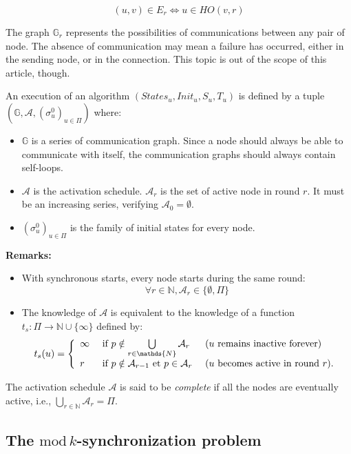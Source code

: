 \documentclass{article}
\newcommand{\ts}{t_{s}}
\begin{document}
$$(u, v) \in E_r \Leftrightarrow u \in HO(v, r)$$

The graph $\mathds{G}_r$ represents the possibilities of communications between any pair of node.
The absence of communication may mean a failure has occurred, either in the sending node, or in the connection.
This topic is out of the scope of this article, though.

An execution of an algorithm $(States_u, Init_u, S_u, T_u)$ is defined by a tuple
$(\mathds{G}, \mathcal{A}, (\sigma^0_u)_{u \in \Pi})$ where:

\begin{itemize}
	\item $\mathds{G}$ is a series of communication graph. Since a node should always be able to communicate 
		with itself, the communication graphs should always contain self-loops.
	\item $\mathcal{A}$ is the activation schedule. $\mathcal{A}_r$ is the set of active node in round $r$.
		It must be an increasing series, verifying $\mathcal{A}_0 = \emptyset$.
	\item $(\sigma^0_u)_{u \in \Pi}$ is the family of initial states for every node.
\end{itemize}

\textbf{Remarks:}

\begin{itemize}
	\item With synchronous starts, every node starts during the same round: 
		$$\forall r \in \mathds{N}, \mathcal{A}_r \in \{\emptyset, \Pi\}$$

	\item The knowledge of $\mathcal{A}$ is equivalent to the knowledge of a function
		$\ts: \Pi \rightarrow \mathds{N} \cup \{\infty\}$ defined by:
		$$\ts(u) = \left \{ \begin{array}{l ll}
		  \infty & \mbox{ if  } p \notin \bigcup\limits_{r \in \mathds{N}}  \mathcal{A}_r & 
			  \mbox { ($u$ remains inactive forever) } \\
		  r  & \mbox{ if  } p \notin \mathcal{A}_{r-1} \mbox{ et } p \in \mathcal{A}_{r}  &
			  \mbox{ ($u$ becomes active in round $r$)}.
		  \end{array} \right.$$

\end{itemize}
The activation schedule $\mathcal{A} $ is said to be \emph{complete} if all the nodes are eventually active,
	i.e., $ \bigcup\limits_{r \in \mathds{N}}  \mathcal{A}_r  = \Pi$.

\subsection{The $\mathrm{mod}\,k$-synchronization problem}
\end{document}

